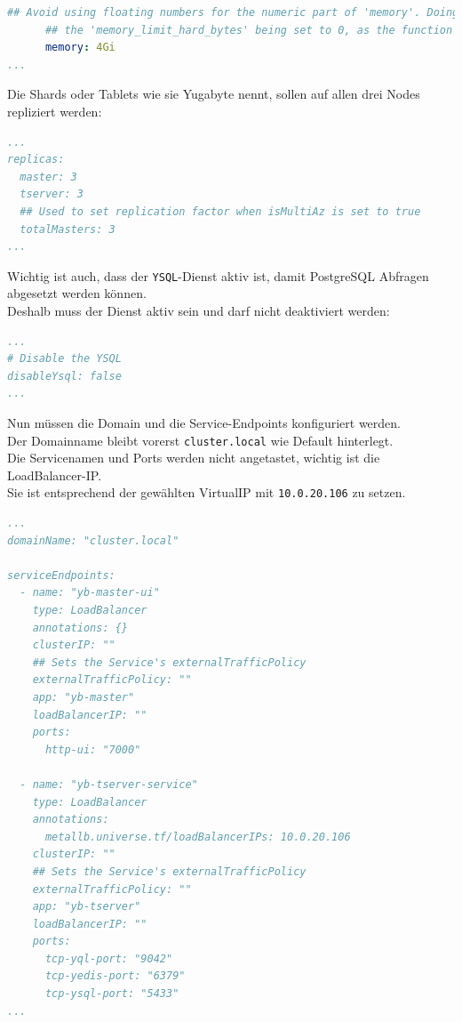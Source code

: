 \begin{flushleft}
\begin{lstlisting}[language=yaml, caption=yugabyteDB - Helm Chart Manifest - Detail Resources,captionpos=b,label={lst:yugabytedb-resources-setting},breaklines=true]
      ## Avoid using floating numbers for the numeric part of 'memory'. Doing so may lead to
      ## the 'memory_limit_hard_bytes' being set to 0, as the function expects integer values.
      memory: 4Gi
...
    \end{lstlisting}
    Die Shards oder Tablets wie sie Yugabyte nennt, sollen auf allen drei Nodes repliziert werden:
    \lstset{style=gra_codestyle}
    \begin{lstlisting}[language=yaml, caption=yugabyteDB - Helm Chart Manifest - Detail Replika,captionpos=b,label={lst:yugabytedb-replica-setting},breaklines=true]
...
replicas:
  master: 3
  tserver: 3
  ## Used to set replication factor when isMultiAz is set to true
  totalMasters: 3
...
    \end{lstlisting}

    Wichtig ist auch, dass der \texttt{YSQL}-Dienst aktiv ist, damit PostgreSQL Abfragen abgesetzt werden können.\\
    Deshalb muss der Dienst aktiv sein und darf nicht deaktiviert werden:
    \lstset{style=gra_codestyle}
    \begin{lstlisting}[language=yaml, caption=yugabyteDB - Helm Chart Manifest - Detail Disable YSQL,captionpos=b,label={lst:yugabytedb-disableYsql-setting},breaklines=true]
...
# Disable the YSQL
disableYsql: false
...
    \end{lstlisting}

    Nun müssen die Domain und die Service-Endpoints konfiguriert werden.\\
    Der Domainname bleibt vorerst \texttt{cluster.local} wie Default hinterlegt.\\
    Die Servicenamen und Ports werden nicht angetastet, wichtig ist die LoadBalancer-IP.\\
    Sie ist entsprechend der gewählten VirtualIP mit \texttt{10.0.20.106} zu setzen.
    \lstset{style=gra_codestyle}
    \begin{lstlisting}[language=yaml, caption=yugabyteDB - Helm Chart Manifest - Detail Domainname und Service-Endpoints,captionpos=b,label={lst:yugabytedb-domainname-serviceendpoints-setting},breaklines=true]
...
domainName: "cluster.local"

serviceEndpoints:
  - name: "yb-master-ui"
    type: LoadBalancer
    annotations: {}
    clusterIP: ""
    ## Sets the Service's externalTrafficPolicy
    externalTrafficPolicy: ""
    app: "yb-master"
    loadBalancerIP: ""
    ports:
      http-ui: "7000"

  - name: "yb-tserver-service"
    type: LoadBalancer
    annotations:
      metallb.universe.tf/loadBalancerIPs: 10.0.20.106
    clusterIP: ""
    ## Sets the Service's externalTrafficPolicy
    externalTrafficPolicy: ""
    app: "yb-tserver"
    loadBalancerIP: ""
    ports:
      tcp-yql-port: "9042"
      tcp-yedis-port: "6379"
      tcp-ysql-port: "5433"
...
    \end{lstlisting}
\end{flushleft}
